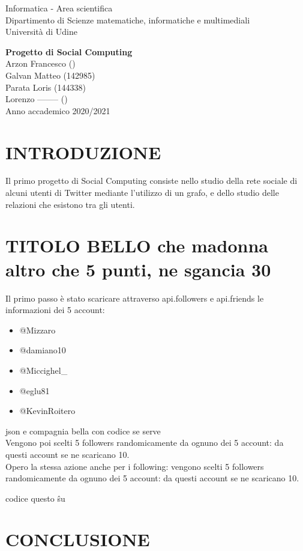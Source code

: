 \documentclass[a4paper,11pt]{report}
\begin{document}
\begin{titlepage}
  \clearpage\thispagestyle{empty}
  \centering
  \vspace{1cm}
  {\normalsize Informatica - Area scientifica \\  Dipartimento di Scienze matematiche, informatiche e multimediali\\  Università di Udine \par}
  \vspace{3cm}
  {\Huge \textbf{Progetto di Social Computing}}\\
  \vspace{4cm}
  {\Large Arzon Francesco ()\\ Galvan Matteo (142985)\\ Parata Loris (144338)\\ Lorenzo -------- ()}\\
  \vspace{12cm}
  {\normalsize Anno accademico 2020/2021}
  \pagebreak
\end{titlepage}

\tableofcontents{}
\pagebreak

\chapter{INTRODUZIONE}
Il primo progetto di Social Computing consiste nello studio della rete sociale di alcuni utenti di Twitter mediante l'utilizzo di un grafo, e dello studio delle relazioni che esistono tra gli utenti.

\pagebreak

\chapter{TITOLO BELLO che madonna altro che 5 punti, ne sgancia 30}
Il primo passo è stato scaricare attraverso api.followers e api.friends le informazioni dei 5 account:

\begin{itemize}
\item @Mizzaro
\item @damiano10
\item @Miccighel\_
\item @eglu81
\item @KevinRoitero
 \end{itemize}
json e compagnia bella con codice se serve \\
\setlength{\parindent}{0pt} 
Vengono poi scelti 5 followers randomicamente da ognuno dei 5 account: da questi account se ne scaricano 10. \\
Opero la stessa azione anche per i following: vengono scelti 5 followers randomicamente da ognuno dei 5 account: da questi account se ne scaricano 10.

codice questo     \^ su


\pagebreak

\chapter{CONCLUSIONE}
\pagebreak
\end{document}
